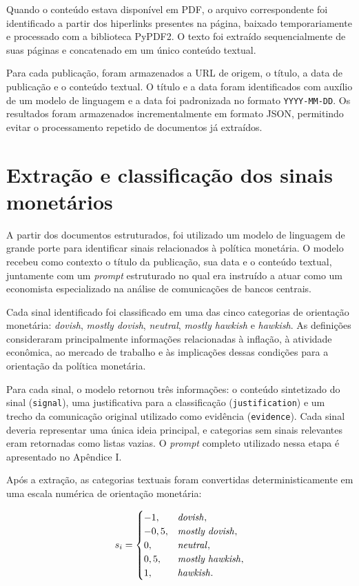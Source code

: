 Quando o conteúdo estava disponível em PDF, o arquivo correspondente foi
identificado a partir dos hiperlinks presentes na página, baixado
temporariamente e processado com a biblioteca PyPDF2. O texto foi extraído
sequencialmente de suas páginas e concatenado em um único conteúdo textual.

Para cada publicação, foram armazenados a URL de origem, o título, a data de
publicação e o conteúdo textual. O título e a data foram identificados com
auxílio de um modelo de linguagem e a data foi padronizada no formato
\texttt{YYYY-MM-DD}. Os resultados foram armazenados incrementalmente em
formato JSON, permitindo evitar o processamento repetido de documentos já
extraídos.

\section{Extração e classificação dos sinais monetários}

A partir dos documentos estruturados, foi utilizado um modelo de linguagem de
grande porte para identificar sinais relacionados à política monetária. O
modelo recebeu como contexto o título da publicação, sua data e o conteúdo
textual, juntamente com um \textit{prompt} estruturado no qual era instruído a
atuar como um economista especializado na análise de comunicações de bancos
centrais.

Cada sinal identificado foi classificado em uma das cinco categorias de
orientação monetária: \textit{dovish}, \textit{mostly dovish},
\textit{neutral}, \textit{mostly hawkish} e \textit{hawkish}. As definições
consideraram principalmente informações relacionadas à inflação, à atividade
econômica, ao mercado de trabalho e às implicações dessas condições para a
orientação da política monetária.

Para cada sinal, o modelo retornou três informações: o conteúdo sintetizado do
sinal (\texttt{signal}), uma justificativa para a classificação
(\texttt{justification}) e um trecho da comunicação original utilizado como
evidência (\texttt{evidence}). Cada sinal deveria representar uma única ideia
principal, e categorias sem sinais relevantes eram retornadas como listas
vazias. O \textit{prompt} completo utilizado nessa etapa é apresentado no
Apêndice I.

Após a extração, as categorias textuais foram convertidas deterministicamente
em uma escala numérica de orientação monetária:

\[
s_i =
\begin{cases}
-1,   & \text{\textit{dovish}},\\
-0,5, & \text{\textit{mostly dovish}},\\
0,    & \text{\textit{neutral}},\\
0,5,  & \text{\textit{mostly hawkish}},\\
1,    & \text{\textit{hawkish}}.
\end{cases}
\]

